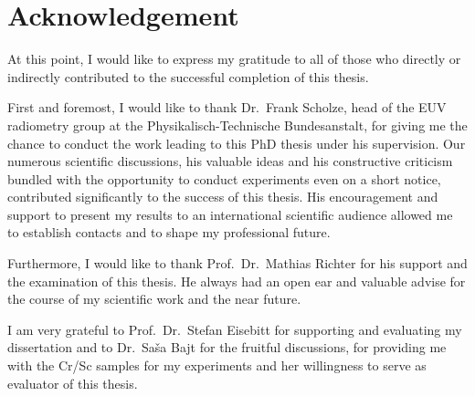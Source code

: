 \pagestyle{empty}
\noindent
\section*{Acknowledgement}
At this point, I would like to express my gratitude to all of those who directly or indirectly contributed to the successful completion of this thesis.

First and foremost, I would like to thank Dr.~Frank Scholze, head of the EUV radiometry group at the Physikalisch-Technische Bundesanstalt, for giving me the chance to conduct the work leading to this PhD thesis under his supervision. Our numerous scientific discussions, his valuable ideas and his constructive criticism bundled with the opportunity to conduct experiments even on a short notice, contributed significantly to the success of this thesis. His encouragement and support to present my results to an international scientific audience allowed me to establish contacts and to shape my professional future.

Furthermore, I would like to thank Prof.~Dr.~Mathias Richter for his support and the examination of this thesis. He always had an open ear and valuable advise for the course of my scientific work and the near future. 

I am very grateful to Prof.~Dr.~Stefan Eisebitt for supporting and evaluating my dissertation and to Dr.~Sa\v{s}a Bajt for the fruitful discussions, for providing me with the Cr/Sc samples for my experiments and her willingness to serve as evaluator of this thesis. 




\cleardoublepage
